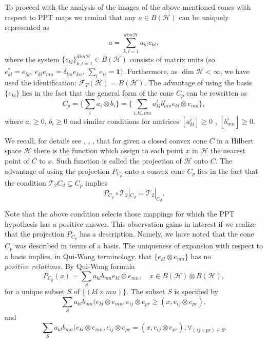 \documentclass{amsart}
\theoremstyle{plain}
\theoremstyle{definition}
\newcommand{\cH}{\mathcal{H}}
\newcommand{\cT}{\mathcal{T}}
\begin{document}
To proceed with the analysis of the images of the above mentioned cones with respect to PPT maps
we remind that any $a \in B(\cH)$ can be uniquely represented as
\begin{equation} 
\label{repre}
a = \sum_{k,l = 1}^{dim \cH} a_{kl} e_{kl},
\end{equation}
where  the system $\{e_{kl} \}_{k,l =1}^{dim \cH} \in B(\cH)$ consists of  matrix units (so $e_{kl}^* = e_{lk}, \ e_{kl} e_{mn} = \delta_{lm} e_{kn}, \ \sum_i e_{ii} = \mathbf{1}) $. Furthermore, as $\dim \cH < \infty$, we have used the identification: $\mathcal {F}_T(\cH)  = B(\cH)$.
The advantage of using the basis $\{e_{kl} \}$ lies in the fact that the general form of the cone $C_p$ can be rewritten as
\begin{equation}
C_p = \{\sum_i a_i \otimes b_i\} = \{\sum_{i,kl,mn} a_{kl}^ib_{mn}^i  e_{kl} \otimes e_{mn}\},
\end{equation}
where $a_i \geq 0$, $b_i \geq 0$ and similar conditions for matrices $[a^i_{kl}] \geq 0$ , $[b^i_{mn}] \geq 0$.

We recall, for details see \cite{Ingram}, \cite{Dom}, \cite{Qui}, that for given a closed convex cone $C$ in a Hilbert space $\cH$ there is the function which assign to each point $x$ in $\cH$ the nearest point of $C$ to $x$. Such function is called the projection of $\cH$ onto $C$.
The advantage of using the projection $P_{C_p}$  onto a convex cone $C_p$ lies in the fact that the condition $\cT_2 C_d \subseteq C_p$ implies 
\begin{equation}
P_{C_p} \circ \cT_2|_{C_d} = \cT_2|_{C_d}.
\end{equation}

Note that the above condition selects those mappings for which the PPT hypothesis has a positive answer. This observation gains in interest if we realize that the projection $P_{C_p}$ has a description. Namely, we have noted that the cone $C_p$ was described in terms of a basis. The uniqueness of expansion with respect to a basis implies, in Qui-Wang terminology, \cite{Qui} that $\{e_{kl} \otimes e_{mn} \}$ has no $\textit{positive relations}$.
By Qui-Wang formula \cite{Qui}
\begin{equation}
P_{C_p}(x) = \sum_{S} a_{kl}b_{mn} e_{kl} \otimes e_{mn}, \quad x \in B(\cH) \otimes B(\cH),
\end{equation}
for a unique subset $S$ of $\{(kl \times mn)\}$. The subset $S$ is specified by
\begin{equation}
\sum_S a_{kl}b_{mn} (e_{kl} \otimes e_{mn}, e_{ij} \otimes e_{pr} \geq (x, e_{ij} \otimes e_{pr}),
\end{equation}
and
\begin{equation}
\sum_S a_{kl}b_{mn} (e_{kl} \otimes e_{mn}, e_{ij} \otimes e_{pr} = (x, e_{ij} \otimes e_{pr}), \forall_{ (ij \times pr) \in S}.
\end{equation}
\end{document}
